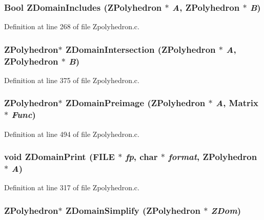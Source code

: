 \subsubsection{\setlength{\rightskip}{0pt plus 5cm}Bool ZDomain\-Includes (ZPolyhedron $\ast$ {\em A}, ZPolyhedron $\ast$ {\em B})}\label{Zpolyhedron_8c_a15}




Definition at line 268 of file Zpolyhedron.c.
\subsubsection{\setlength{\rightskip}{0pt plus 5cm}ZPolyhedron$\ast$ ZDomain\-Intersection (ZPolyhedron $\ast$ {\em A}, ZPolyhedron $\ast$ {\em B})}\label{Zpolyhedron_8c_a19}




Definition at line 375 of file Zpolyhedron.c.
\subsubsection{\setlength{\rightskip}{0pt plus 5cm}ZPolyhedron$\ast$ ZDomain\-Preimage (ZPolyhedron $\ast$ {\em A}, Matrix $\ast$ {\em Func})}\label{Zpolyhedron_8c_a22}




Definition at line 494 of file Zpolyhedron.c.
\subsubsection{\setlength{\rightskip}{0pt plus 5cm}void ZDomain\-Print (FILE $\ast$ {\em fp}, char $\ast$ {\em format}, ZPolyhedron $\ast$ {\em A})}\label{Zpolyhedron_8c_a17}




Definition at line 317 of file Zpolyhedron.c.
\subsubsection{\setlength{\rightskip}{0pt plus 5cm}ZPolyhedron$\ast$ ZDomain\-Simplify (ZPolyhedron $\ast$ {\em ZDom})}\label{Zpolyhedron_8c_a25}





